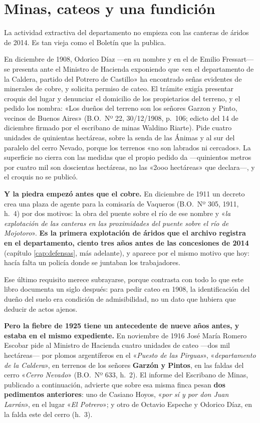 \section{Minas, cateos y una fundición}

La actividad extractiva del departamento no empieza con las canteras de áridos de 2014. Es
tan vieja como el Boletín que la publica.

En diciembre de 1908, Odorico Díaz —en su nombre y en el de Emilio Fressart— se presenta
ante el Ministro de Hacienda exponiendo que «en el departamento de la Caldera, partido del
Potrero de Castillo» ha encontrado señas evidentes de minerales de cobre, y solicita
permiso de cateo. El trámite exigía presentar croquis del lugar y denunciar el domicilio de
los propietarios del terreno, y el pedido los nombra: «Los dueños del terreno son los señores
Garzon y Pinto, vecinos de Buenos Aires» (B.O.\ Nº 22, 30/12/1908, p.\ 106; edicto del 14 de
diciembre firmado por el escribano de minas Waldino Riarte). Pide cuatro unidades de quinientas
hectáreas, sobre la senda de las Ánimas y al sur del paralelo del cerro Nevado, porque los
terrenos «no son labrados ni cercados». La superficie no cierra con las medidas que el propio
pedido da ---quinientos metros por cuatro mil son doscientas hectáreas, no las «2ooo hectáreas»
que declara---, y el croquis no se publicó.

\textbf{Y la piedra empezó antes que el cobre.} En diciembre de 1911 un decreto crea una plaza
de agente para la comisaría de Vaqueros (B.O.\ Nº 305, 1911, h.\ 4) por dos motivos: la obra del puente sobre el río de ese
nombre y «\textit{la explotación de las canteras en las proximidades del puente sobre el río de
Mojotoro}». \textbf{Es la primera explotación de áridos que el archivo registra en el
departamento, ciento tres años antes de las concesiones de 2014} (capítulo \ref{cap:defensas}, más adelante),
y aparece por el mismo motivo que hoy: hacía falta un policía donde se juntaban los
trabajadores.

Ese último requisito merece subrayarse, porque contrasta con todo lo que este libro
documenta un siglo después: para pedir cateo en 1908, la identificación del dueño del suelo
era condición de admisibilidad, no un dato que hubiera que deducir de actos ajenos.

\textbf{Pero la fiebre de 1925 tiene un antecedente de nueve años antes, y estaba en el mismo
expediente.} En noviembre de 1916 José María Romero Escobar pide al Ministro de Hacienda cuatro
unidades de cateo ---dos mil hectáreas--- por plomos argentíferos en el «\textit{Puesto de las
Pirguas}», «\textit{departamento de la Caldera}», en terrenos de los señores \textbf{Garzón y Pintos},
en las faldas del cerro «\textit{Cerro Nevado}» (B.O.\ Nº 633, h.\ 2). El informe del Escribano de
Minas, publicado a continuación, advierte que sobre esa misma finca pesan \textbf{dos pedimentos
anteriores}: uno de Casiano Hoyos, «\textit{por sí y por don Juan Larrán}», en el
lugar «\textit{El Potrero}»; y otro de Octavio Espeche y Odorico Díaz, en la falda este del cerro
(h.\ 3).

